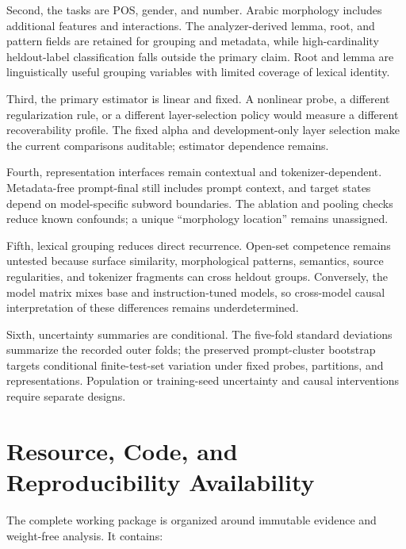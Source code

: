\documentclass[pdflatex,sn-basic]{sn-jnl}
\begin{document}
Second, the tasks are POS, gender, and number. Arabic morphology includes
additional features and interactions. The analyzer-derived lemma, root, and
pattern fields are retained for grouping and metadata, while high-cardinality
heldout-label classification falls outside the primary claim. Root and lemma
are linguistically useful grouping variables with limited coverage of lexical
identity.

Third, the primary estimator is linear and fixed. A nonlinear probe, a
different regularization rule, or a different layer-selection policy would
measure a different recoverability profile. The fixed alpha and
development-only layer selection make the current comparisons auditable;
estimator dependence remains.

Fourth, representation interfaces remain contextual and tokenizer-dependent.
Metadata-free prompt-final still includes prompt context, and target states
depend on model-specific subword boundaries. The ablation and pooling checks
reduce known confounds; a unique ``morphology location'' remains unassigned.

Fifth, lexical grouping reduces direct recurrence. Open-set competence remains
untested because surface similarity, morphological patterns, semantics, source
regularities, and tokenizer fragments can cross heldout groups. Conversely,
the model matrix mixes base and instruction-tuned models, so cross-model
causal interpretation of these differences remains underdetermined.

Sixth, uncertainty summaries are conditional. The five-fold standard
deviations summarize the recorded outer folds; the preserved prompt-cluster
bootstrap targets conditional finite-test-set variation under fixed probes,
partitions, and representations. Population or training-seed uncertainty and
causal interventions require separate designs.

\section{Resource, Code, and Reproducibility Availability}

The complete working package is organized around immutable evidence and
weight-free analysis. It contains:
\end{document}
